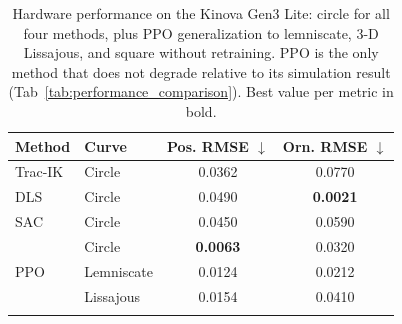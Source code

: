 \documentclass[preprint,12pt]{elsarticle}
\begin{document}
\begin{table}[h]
\centering
\caption{Hardware performance on the Kinova Gen3 Lite: circle for all
four methods, plus PPO generalization to lemniscate, 3-D Lissajous, and
square without retraining. PPO is the only method that does not degrade
relative to its simulation result (Tab~\ref{tab:performance_comparison}). Best value per metric in
bold.}
\label{tab:trajectory_tracking}
\renewcommand{\arraystretch}{1.0}
\setlength{\tabcolsep}{3pt}
\begin{tabular}{llcc}
\toprule
\textbf{Method} & \textbf{Curve} & \textbf{Pos. RMSE} $\downarrow$ & \textbf{Orn. RMSE} $\downarrow$ \\
\midrule

Trac-IK
& Circle & 0.0362 & 0.0770 \\
\midrule

DLS
& Circle & 0.0490 & \textbf{0.0021} \\
\midrule

SAC
& Circle & 0.0450 & 0.0590 \\
\midrule

\multirow{3}{*}{PPO}
& Circle     & \textbf{0.0063} & 0.0320 \\
& Lemniscate & 0.0124 & 0.0212 \\
& Lissajous  & 0.0154 & 0.0410 \\

\bottomrule
\label{tab:error_metrics_real}
\end{tabular}
\end{table}
\end{document}
